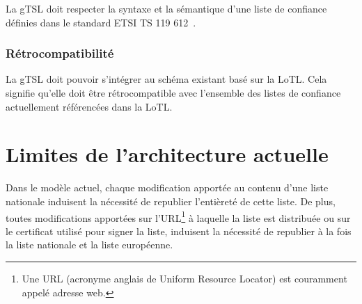 \documentclass{tnreport}
\begin{document}
La gTSL doit respecter la syntaxe et la sémantique d'une liste de confiance définies dans le standard ETSI TS 119 612~\cite{ETSITS119612}.

\subsubsection{Rétrocompatibilité}

La gTSL doit pouvoir s'intégrer au schéma existant basé sur la LoTL. Cela signifie qu'elle doit être rétrocompatible avec l'ensemble des listes de confiance actuellement référencées dans la LoTL.

\section{Limites de l'architecture actuelle}
\label{sec:limits}

Dans le modèle actuel, chaque modification apportée au contenu d'une liste nationale induisent la nécessité de republier l'entièreté de cette liste. De plus, toutes modifications apportées sur l'URL\footnote{Une URL (acronyme anglais de Uniform Resource Locator) est couramment appelé adresse web.} à laquelle la liste est distribuée ou sur le certificat utilisé pour signer la liste, induisent la nécessité de republier à la fois la liste nationale et la liste européenne.
\end{document}
